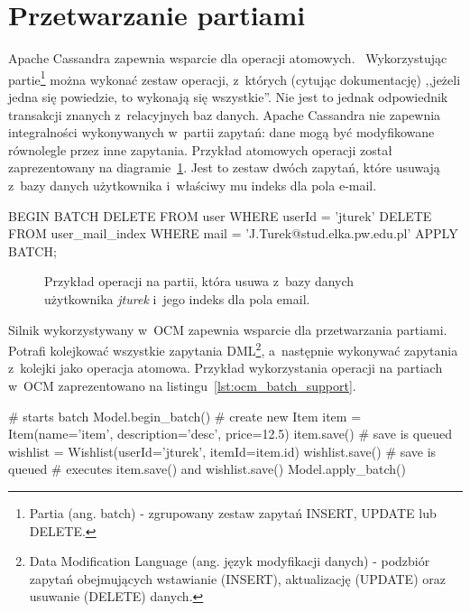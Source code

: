 \section{Przetwarzanie partiami}

Apache Cassandra zapewnia wsparcie dla operacji atomowych.~\cite{cassandra_batch_operations} Wykorzystując partie\footnote{Partia (ang. batch) - zgrupowany zestaw zapytań INSERT, UPDATE lub DELETE.} można wykonać zestaw operacji, z~których (cytując dokumentację) ,,jeżeli jedna się powiedzie, to wykonają się wszystkie''. Nie jest to jednak odpowiednik transakcji znanych z~relacyjnych baz danych. Apache Cassandra nie zapewnia integralności wykonywanych w~partii zapytań: dane mogą być modyfikowane równolegle przez inne zapytania. Przykład atomowych operacji został zaprezentowany na diagramie~\ref{lst:batch_operation_cql_example}. Jest to zestaw dwóch zapytań, które usuwają z~bazy danych użytkownika i~właściwy mu indeks dla pola e-mail.

\begin{verbbox}
	BEGIN BATCH
	  DELETE FROM user WHERE userId = 'jturek'
	  DELETE FROM user_mail_index WHERE mail = 'J.Turek@stud.elka.pw.edu.pl'
	APPLY BATCH;
\end{verbbox}

\begin{figure}[ht!]
	\centering
	\theverbbox
	\caption{Przykład operacji na partii, która usuwa z~bazy danych użytkownika \emph{jturek} i~jego indeks dla pola email.}
	\label{lst:batch_operation_cql_example}
\end{figure}

Silnik wykorzystywany w~OCM zapewnia wsparcie dla przetwarzania partiami. Potrafi kolejkować wszystkie zapytania DML\footnote{Data Modification Language (ang. język modyfikacji danych) - podzbiór zapytań obejmujących wstawianie (INSERT), aktualizację (UPDATE) oraz usuwanie (DELETE) danych.}, a~następnie wykonywać zapytania z~kolejki jako operacja atomowa. Przykład wykorzystania operacji na partiach w~OCM zaprezentowano na listingu~\ref{lst:ocm_batch_support}.

\begin{verbbox}
	# starts batch
	Model.begin_batch()
	# create new Item
	item = Item(name='item', description='desc', price=12.5)
	item.save()    # save is queued
	wishlist = Wishlist(userId='jturek', itemId=item.id)
	wishlist.save()    # save is queued
	# executes item.save() and wishlist.save()
	Model.apply_batch()
\end{verbbox}

